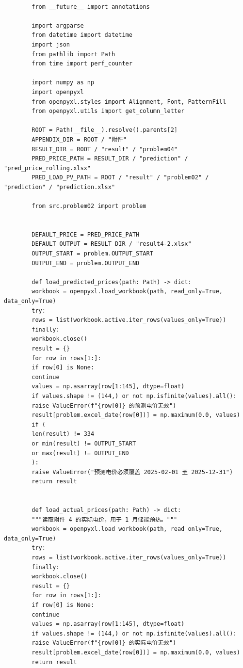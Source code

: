 \documentclass[UTF8]{ctexart}
\begin{document}
    \begin{verbatim}
        
        from __future__ import annotations
        
        import argparse
        from datetime import datetime
        import json
        from pathlib import Path
        from time import perf_counter
        
        import numpy as np
        import openpyxl
        from openpyxl.styles import Alignment, Font, PatternFill
        from openpyxl.utils import get_column_letter
        
        ROOT = Path(__file__).resolve().parents[2]
        APPENDIX_DIR = ROOT / "附件"
        RESULT_DIR = ROOT / "result" / "problem04"
        PRED_PRICE_PATH = RESULT_DIR / "prediction" / "pred_price_rolling.xlsx"
        PRED_LOAD_PV_PATH = ROOT / "result" / "problem02" / "prediction" / "prediction.xlsx"
        
        from src.problem02 import problem
        
        
        DEFAULT_PRICE = PRED_PRICE_PATH
        DEFAULT_OUTPUT = RESULT_DIR / "result4-2.xlsx"
        OUTPUT_START = problem.OUTPUT_START
        OUTPUT_END = problem.OUTPUT_END
        
        def load_predicted_prices(path: Path) -> dict:
        workbook = openpyxl.load_workbook(path, read_only=True, data_only=True)
        try:
        rows = list(workbook.active.iter_rows(values_only=True))
        finally:
        workbook.close()
        result = {}
        for row in rows[1:]:
        if row[0] is None:
        continue
        values = np.asarray(row[1:145], dtype=float)
        if values.shape != (144,) or not np.isfinite(values).all():
        raise ValueError(f"{row[0]} 的预测电价无效")
        result[problem.excel_date(row[0])] = np.maximum(0.0, values)
        if (
        len(result) != 334
        or min(result) != OUTPUT_START
        or max(result) != OUTPUT_END
        ):
        raise ValueError("预测电价必须覆盖 2025-02-01 至 2025-12-31")
        return result
        
        
        def load_actual_prices(path: Path) -> dict:
        """读取附件 4 的实际电价，用于 1 月储能预热。"""
        workbook = openpyxl.load_workbook(path, read_only=True, data_only=True)
        try:
        rows = list(workbook.active.iter_rows(values_only=True))
        finally:
        workbook.close()
        result = {}
        for row in rows[1:]:
        if row[0] is None:
        continue
        values = np.asarray(row[1:145], dtype=float)
        if values.shape != (144,) or not np.isfinite(values).all():
        raise ValueError(f"{row[0]} 的实际电价无效")
        result[problem.excel_date(row[0])] = np.maximum(0.0, values)
        return result
        

\end{verbatim}
\end{document}
